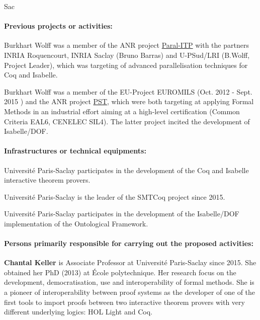 \begin{sitedescription}{Sac}
\paragraph*{Previous projects or activities:}

\begin{compactitem}
\item Burkhart Wolff was a member of the ANR project
  \href{http://www.lri.fr/~wolff/projects/ANR-Paral-ITP/}{Paral-ITP}
  with the partners INRIA Roquencourt, INRIA Saclay (Bruno Barras) and
  U-PSud/LRI (B.Wolff, Project Leader), which was targeting of advanced
  parallelisation techniques for Coq and Isabelle.
\item Burkhart Wolff was a member of the EU-Project EUROMILS (Oct. 2012
  - Sept. 2015 ) and the ANR project
  \href{http://www.irt-systemx.fr/en/project/pst/}{PST}, which were both
  targeting at applying Formal Methods in an industrial effort aiming at
  a high-level certification (Common Criteria EAL6, CENELEC SIL4). The
  latter project incited the development of
  Isabelle/DOF\cite{brucker_achim_d_2019_3370483}.
\end{compactitem} 

\paragraph*{Infrastructures or technical equipments:}

\begin{compactitem}
\item Université Paris-Saclay participates in the development of the Coq
  and Isabelle interactive theorem provers.
\item Université Paris-Saclay is the leader of the SMTCoq project since
  2015.
\item Université Paris-Saclay participates in the development of the
  Isabelle/DOF implementation of the Ontological Framework.
\end{compactitem}

\paragraph*{Persons primarily responsible for carrying out the proposed
  activities:}

\begin{compactitem} %

\item {\bf Chantal Keller} is Associate Professor at Université
  Paris-Saclay since 2015. She obtained her PhD (2013) at École
  polytechnique. Her research focus on the development, democratisation,
  use and interoperability of formal methods. She is a pioneer of
  interoperability between proof systems as the developer of one of the
  first tools to import proofs between two interactive theorem provers
  with very different underlying logics: HOL Light and Coq.


\end{compactitem}
\end{sitedescription}
